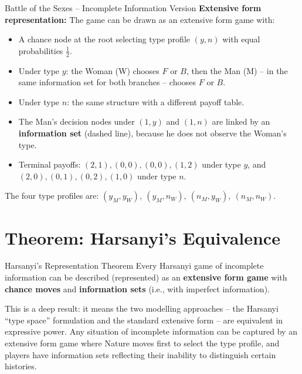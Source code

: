 \documentclass[12pt, a4paper]{article}
\begin{document}
\begin{exbox}{Battle of the Sexes -- Incomplete Information Version}
\medskip
\noindent\textbf{Extensive form representation:} The game can be drawn as an extensive form game with:
\begin{itemize}
  \item A chance node at the root selecting type profile $(y, n)$ with equal probabilities $\tfrac{1}{2}$.
  \item Under type $y$: the Woman (W) chooses $F$ or $B$, then the Man (M) -- in the same information set for both branches -- chooses $F$ or $B$.
  \item Under type $n$: the same structure with a different payoff table.
  \item The Man's decision nodes under $(1,y)$ and $(1,n)$ are linked by an \textbf{information set} (dashed line), because he does not observe the Woman's type.
  \item Terminal payoffs: $(2,1),(0,0),(0,0),(1,2)$ under type $y$, and $(2,0),(0,1),(0,2),(1,0)$ under type $n$.
\end{itemize}

The four type profiles are: $(y_M, y_W),\ (y_M, n_W),\ (n_M, y_W),\ (n_M, n_W)$.

\end{exbox}

\section{Theorem: Harsanyi's Equivalence}

\begin{thmbox}{Harsanyi's Representation Theorem}
Every Harsanyi game of incomplete information can be described (represented) as an \textbf{extensive form game} with \textbf{chance moves} and \textbf{information sets} (i.e., with imperfect information).
\end{thmbox}

\begin{notebox}
This is a deep result: it means the two modelling approaches -- the Harsanyi ``type space'' formulation and the standard extensive form -- are equivalent in expressive power. Any situation of incomplete information can be captured by an extensive form game where Nature moves first to select the type profile, and players have information sets reflecting their inability to distinguish certain histories.
\end{notebox}
\end{document}
